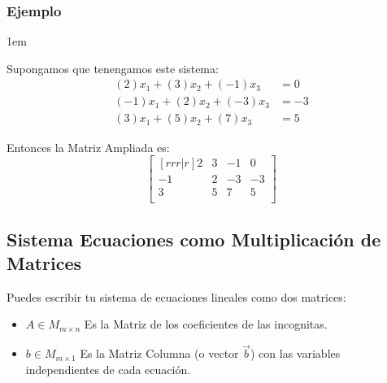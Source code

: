 \documentclass[12pt, fleqn]{report}                             %
\newenvironment{SmallIndentation}[1][0.75em]                    %
        {\begin{adjustwidth}{#1}{}\begin{footnotesize}}             %
        {\end{footnotesize}\end{adjustwidth}}                       %
\theoremstyle{break}                                            %
\begin{document}
                \subsubsection{Ejemplo}
                \begin{SmallIndentation}[1em]
                    
                    Supongamos que tenengamos este sistema:
                    \begin{align*}
                        (2)x_1  +  (3)x_2 + (-1)x_3 &= 0    \\
                        (-1)x_1 +  (2)x_2 + (-3)x_3 &= -3   \\
                        (3)x_1  +  (5)x_2 + (7)x_3  &= 5    
                    \end{align*}

                    Entonces la Matriz Ampliada es:
                    \begin{equation*}
                        \begin{bmatrix}[rrr|r]
                            2  & 3 & -1 & 0  \\
                            -1 & 2 & -3 & -3 \\
                            3  & 5 & 7  & 5  \\
                        \end{bmatrix}
                    \end{equation*}

                \end{SmallIndentation}


            \clearpage
            \subsection{Sistema Ecuaciones como Multiplicación de Matrices}

                Puedes escribir tu sistema de ecuaciones lineales como dos matrices:
                \begin{itemize}
                    \item $A \in M_{m \times n}$ Es la Matriz de los coeficientes de las incognitas.

                    \item $b \in M_{m \times 1}$ Es la Matriz Columna (o vector $\vec{b}$) con las variables 
                        independientes de cada ecuación.
                \end{itemize}
\end{document}
